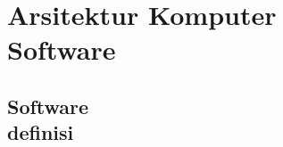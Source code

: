 \documentclass{WileySix}
\begin{document}












\part[Definisi dan Software]
{Arsitektur Komputer\\ Software}

\chapter[Definisi]
{Software\\ definisi}

\end{document}
